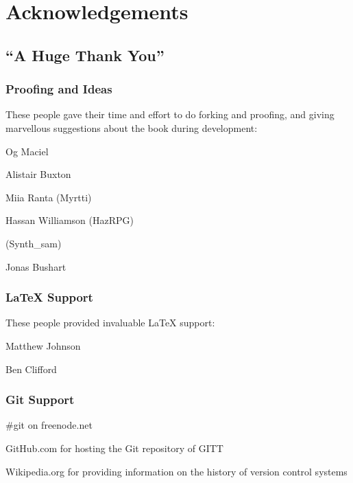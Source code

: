 \chapter{Acknowledgements}
\section{``A Huge Thank You''}

\subsection{Proofing and Ideas}
These people gave their time and effort to do forking and proofing, and giving marvellous suggestions about the book during development:

Og Maciel

Alistair Buxton

Miia Ranta (Myrtti)

Hassan Williamson (HazRPG)

(Synth\_sam)

Jonas Bushart

\subsection{\LaTeX{} Support}
These people provided invaluable \LaTeX{} support:

Matthew Johnson

Ben Clifford

\subsection{Git Support}
\#git on freenode.net

GitHub.com for hosting the Git repository of GITT

Wikipedia.org for providing information on the history of version control systems
\printindex
